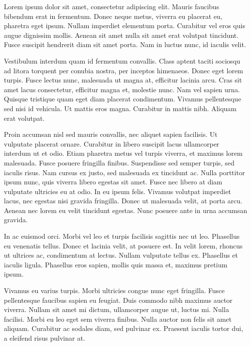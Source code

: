 Lorem ipsum dolor sit amet, consectetur adipiscing elit. Mauris faucibus bibendum erat in fermentum. Donec neque metus, viverra eu placerat eu, pharetra eget ipsum. Nullam imperdiet elementum porta. Curabitur vel eros quis augue dignissim mollis. Aenean sit amet nulla sit amet erat volutpat tincidunt. Fusce suscipit hendrerit diam sit amet porta. Nam in luctus nunc, id iaculis velit.

Vestibulum interdum quam id fermentum convallis. Class aptent taciti sociosqu ad litora torquent per conubia nostra, per inceptos himenaeos. Donec eget lorem turpis. Fusce lectus nunc, malesuada ut magna at, efficitur lacinia arcu. Cras sit amet lacus consectetur, efficitur magna et, molestie nunc. Nam vel sapien urna. Quisque tristique quam eget diam placerat condimentum. Vivamus pellentesque sed nisi id vehicula. Ut mattis eros magna. Curabitur in mattis nibh. Aliquam erat volutpat.

Proin accumsan nisl sed mauris convallis, nec aliquet sapien facilisis. Ut vulputate placerat ornare. Curabitur in libero suscipit lacus ullamcorper interdum ut et odio. Etiam pharetra metus vel turpis viverra, et maximus lorem malesuada. Fusce posuere fringilla finibus. Suspendisse sed semper turpis, sed iaculis risus. Nam cursus ex justo, sed malesuada ex tincidunt ac. Nulla porttitor ipsum nunc, quis viverra libero egestas sit amet. Fusce nec libero at diam vulputate ultricies eu at odio. In eu ipsum felis. Vivamus volutpat imperdiet lacus, nec egestas nisi gravida fringilla. Donec ut malesuada velit, at porta arcu. Aenean nec lorem eu velit tincidunt egestas. Nunc posuere ante in urna accumsan gravida.

In ac euismod orci. Morbi vel leo et turpis facilisis sagittis nec ut leo. Phasellus eu venenatis tellus. Donec et lacinia velit, at posuere est. In velit lorem, rhoncus ut ultrices ac, condimentum at lectus. Nullam vulputate tellus ex. Phasellus et iaculis ligula. Phasellus eros sapien, mollis quis massa et, maximus pretium ipsum.

Vivamus eu varius turpis. Morbi ultricies congue nunc eget fringilla. Fusce pellentesque faucibus sapien eu feugiat. Duis commodo nibh maximus auctor viverra. Nullam sit amet mi dictum, ullamcorper augue ut, luctus mi. Nulla facilisi. Morbi eu leo eget sem viverra finibus. Nulla auctor non felis sit amet aliquam. Curabitur ac sodales diam, sed pulvinar ex. Praesent iaculis tortor dui, a eleifend risus pulvinar at.
